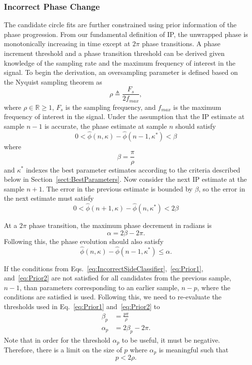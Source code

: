 \documentclass[journal,11pt,a4paper,onecolumn,draftcls]{IEEEtran}
\begin{document}
\subsubsection{Incorrect Phase Change}
The candidate circle fits are further constrained using prior information of the phase progression. From our fundamental definition of IP, the unwrapped phase is monotonically increasing in time except at $2\pi$ phase transitions. A phase increment threshold and a phase transition threshold can be derived given knowledge of the sampling rate and the maximum frequency of interest in the signal. To begin the derivation, an oversampling parameter is defined based on the Nyquist sampling theorem as
\begin{equation}
	\rho\triangleq\frac{F_s}{2f_{max}},
\end{equation}
where $\rho \in \mathbb{R} \ge 1$, $F_s$ is the sampling frequency, and $f_{max}$ is the maximum frequency of interest in the signal. Under the assumption that the IP estimate at sample $n-1$ is accurate, the phase estimate at sample $n$ should satisfy
\begin{equation}
	0 < \hat\phi(n,\kappa)-\hat\phi(n-1,\kappa^*) < \beta
\end{equation}
where 
\begin{equation}
	\beta = \frac{\pi}{\rho}
\end{equation}
and $\kappa^*$ indexes the best parameter estimates according to the criteria described below in Section~\ref{sect:BestParameters}. Now consider the next IP estimate at the sample $n+1$. The error in the previous estimate is bounded by $\beta$, so the error in the next estimate must satisfy
\begin{equation}\label{eq:Prior1}
	0 < \hat\phi(n+1,\kappa)-\hat\phi(n,\kappa^*) < 2\beta
\end{equation} 

At a $2\pi$ phase transition, the maximum phase decrement in radians is
\begin{equation}
	\alpha=2\beta-2\pi.
\end{equation}
Following this, the phase evolution should also satisfy
\begin{equation}\label{eq:Prior2}
\hat{\phi} \left( n,\kappa \right) - \hat{\phi} \left( n-1,\kappa^* \right) \le \alpha. 
\end{equation}

If the conditions from Eqs.~\ref{eq:IncorrectSideClassifier},~\ref{eq:Prior1}, and~\ref{eq:Prior2} are not satisfied for all candidates from the previous sample, $n-1$, than parameters corresponding to an earlier sample, $n-p$, where the conditions are satisfied is used. Following this, we need to re-evaluate the thresholds used in Eq.~\ref{eq:Prior1} and~\ref{eq:Prior2} to
\begin{align}
	\beta_p &= \frac{p\pi}{\rho} \\
	\alpha_p &=2\beta_p-2\pi.
\end{align}
Note that in order for the threshold $\alpha_p$ to be useful, it must be negative. Therefore, there is a limit on the size of $p$ where $\alpha_p$ is meaningful such that
\begin{equation}
	p < 2\rho.
\end{equation}
\end{document}
